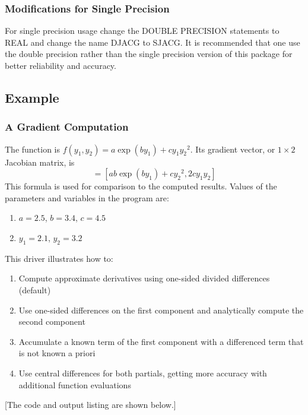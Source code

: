 \documentclass[twoside]{MATH77}
\begin{document}
\subsubsection{Modifications for Single Precision}

For single precision usage change the DOUBLE PRECISION statements to REAL and
change the name DJACG to SJACG. It is recommended that one use the double
precision rather than the single precision version of this package for better
reliability and accuracy.

\subsection{Example}
\subsubsection{A Gradient Computation}

The function is $f(y_1,y_2) = a \exp(b y_1)+c y_1 {y_2}^2$.  Its gradient
vector, or $1 \times 2$ Jacobian matrix, is
  \begin{equation*}
  [\partial f/\partial y_1,\partial f/\partial y_2]=
                         [a b \exp(b y_1)+c {y_2}^2, 2c y_1 y_2]
  \end{equation*}
  This formula is used for comparison to the computed results.  Values of the
  parameters and variables in the program are:

\begin{enumerate}
\item[] $a=2.5$, $b=3.4$, $c=4.5$
\item[] $y_1=2.1$, $y_2=3.2$
\end{enumerate}

This driver illustrates how to:
\begin{enumerate}
\item Compute approximate derivatives using one-sided divided differences
  (default)
\item Use one-sided differences on the first component and analytically
  compute the second component
\item Accumulate a known term of the first component with a differenced term
  that is not known a priori
\item Use central differences for both partials, getting more accuracy with
  additional function evaluations
\end{enumerate}

[The code and output listing are shown below.]
\end{document}
